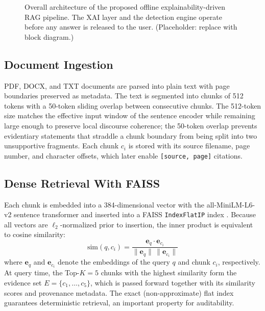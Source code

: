 \documentclass[journal]{IEEEtran}
\begin{document}
\begin{figure}[!t]
\centering
{}
\caption{Overall architecture of the proposed offline explainability-driven
RAG pipeline. The XAI layer and the detection engine operate before any
answer is released to the user. (Placeholder: replace with block diagram.)}
\label{fig:pipeline}
\end{figure}

\subsection{Document Ingestion}
PDF, DOCX, and TXT documents are parsed into plain text with page boundaries
preserved as metadata. The text is segmented into chunks of 512 tokens with
a 50-token sliding overlap between consecutive chunks. The 512-token size
matches the effective input window of the sentence encoder while remaining
large enough to preserve local discourse coherence; the 50-token overlap
prevents evidentiary statements that straddle a chunk boundary from being
split into two unsupportive fragments. Each chunk $c_i$ is stored with its
source filename, page number, and character offsets, which later enable
\texttt{[source, page]} citations.

\subsection{Dense Retrieval With FAISS}
Each chunk is embedded into a 384-dimensional vector with the
all-MiniLM-L6-v2 sentence transformer \cite{reimers2019sbert} and inserted
into a FAISS \texttt{IndexFlatIP} index \cite{johnson2019faiss}. Because all
vectors are $\ell_2$-normalized prior to insertion, the inner product is
equivalent to cosine similarity:
\begin{equation}
\mathrm{sim}(q, c_i) = \frac{\mathbf{e}_q \cdot \mathbf{e}_{c_i}}
{\lVert \mathbf{e}_q \rVert \, \lVert \mathbf{e}_{c_i} \rVert}
\label{eq:cosine}
\end{equation}
where $\mathbf{e}_q$ and $\mathbf{e}_{c_i}$ denote the embeddings of the
query $q$ and chunk $c_i$, respectively. At query time, the Top-$K{=}5$
chunks with the highest similarity form the evidence set
$E = \{c_1, \ldots, c_5\}$, which is passed forward together with its
similarity scores and provenance metadata. The exact (non-approximate) flat
index guarantees deterministic retrieval, an important property for
auditability.
\end{document}
